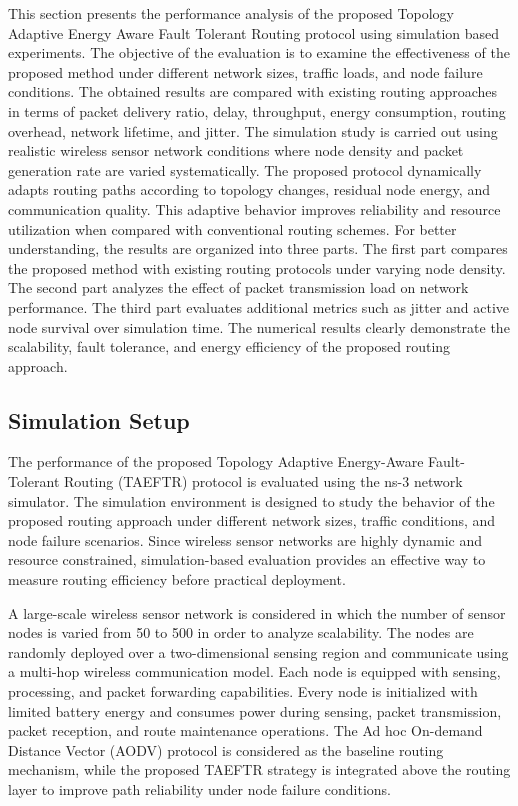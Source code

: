 \documentclass[a4paper,fleqn]{cas-dc}
\numberwithin{equation}{section}
\begin{document}
This section presents the performance analysis of the proposed Topology Adaptive Energy Aware Fault Tolerant Routing protocol using simulation based experiments. The objective of the evaluation is to examine the effectiveness of the proposed method under different network sizes, traffic loads, and node failure conditions. The obtained results are compared with existing routing approaches in terms of packet delivery ratio, delay, throughput, energy consumption, routing overhead, network lifetime, and jitter. The simulation study is carried out using realistic wireless sensor network conditions where node density and packet generation rate are varied systematically. The proposed protocol dynamically adapts routing paths according to topology changes, residual node energy, and communication quality. This adaptive behavior improves reliability and resource utilization when compared with conventional routing schemes. For better understanding, the results are organized into three parts. The first part compares the proposed method with existing routing protocols under varying node density. The second part analyzes the effect of packet transmission load on network performance. The third part evaluates additional metrics such as jitter and active node survival over simulation time. The numerical results clearly demonstrate the scalability, fault tolerance, and energy efficiency of the proposed routing approach.
\FloatBarrier
\subsection{Simulation Setup}

The performance of the proposed Topology Adaptive Energy-Aware Fault-Tolerant Routing (TAEFTR) protocol is evaluated using the ns-3 network simulator. The simulation environment is designed to study the behavior of the proposed routing approach under different network sizes, traffic conditions, and node failure scenarios. Since wireless sensor networks are highly dynamic and resource constrained, simulation-based evaluation provides an effective way to measure routing efficiency before practical deployment.

A large-scale wireless sensor network is considered in which the number of sensor nodes is varied from 50 to 500 in order to analyze scalability. The nodes are randomly deployed over a two-dimensional sensing region and communicate using a multi-hop wireless communication model. Each node is equipped with sensing, processing, and packet forwarding capabilities. Every node is initialized with limited battery energy and consumes power during sensing, packet transmission, packet reception, and route maintenance operations. The Ad hoc On-demand Distance Vector (AODV) protocol is considered as the baseline routing mechanism, while the proposed TAEFTR strategy is integrated above the routing layer to improve path reliability under node failure conditions.
\end{document}
